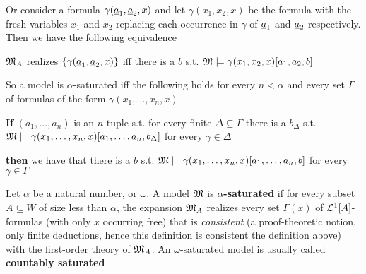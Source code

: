 \documentclass[11pt]{article}
\begin{document}
Or consider a formula \(\gamma(\underline{a}_1,\underline{a}_2,x)\) and let \(\gamma(x_1,x_2,x)\)
be the formula with the fresh variables \(x_1\) and \(x_2\) replacing each
occurrence in \(\gamma\) of \(\underline{a}_1\) and \(\underline{a}_2\) respectively. Then we
have the following equivalence

\begin{center}
\(\mathfrak{M}_A\) realizes \(\{\gamma(\underline{a}_1,\underline{a}_2,x)\}\) iff there is a \(b\)
s.t. \(\mathfrak{M}\models\gamma(x_1,x_2,x)[a_1,a_2,b]\)
\end{center}

So a model is \(\alpha\)-saturated iff the following holds for every
\(n<\alpha\) and every set \(\Gamma\) of formulas of the form \(\gamma(x_1,\dots,x_n,x)\)

\begin{center}
\textbf{If} \((a_1,\dots,a_n)\) is an \(n\)-tuple s.t. for every finite
\(\Delta\subseteq\Gamma\) there is a \(b_{\Delta}\) s.t.
\(\mathfrak{M}\models\gamma(x_1,\dots,x_n,x)[a_1,\dots,a_n,b_\Delta]\) for every
\(\gamma\in\Delta\)


\textbf{then} we have that there is a \(b\) s.t.
 \(\mathfrak{M}\models\gamma(x_1,\dots,x_n,x)[a_1,\dots,a_n,b]\) for every \(\gamma\in\Gamma\)
\end{center}


\begin{definition}[]
Let \(\alpha\) be a natural number, or \(\omega\). A model \(\mathfrak{M}\) is \textbf{\(\alpha\)-saturated}
if for  every subset \(A\subseteq W\) of size less than \(\alpha\), the expansion
\(\mathfrak{M}_A\) realizes every set \(\Gamma(x)\) of \(\mathcal{L}^1[A]\)-formulas (with only
\(x\) occurring free) that is \emph{consistent} (a proof-theoretic notion, only
finite deductions, hence this definition is consistent the definition above)
with the first-order theory of
\(\mathfrak{M}_A\). An \(\omega\)-saturated model is usually called \textbf{countably saturated}
\end{definition}
\end{document}

